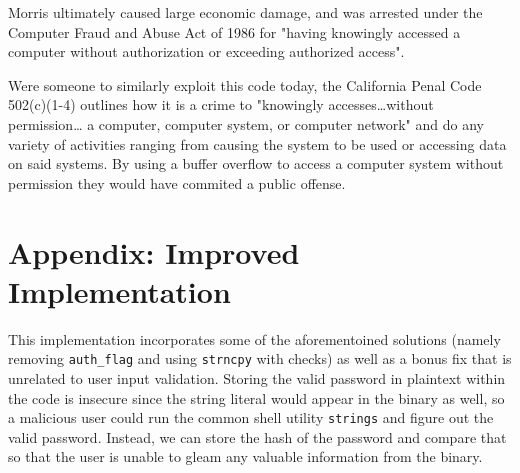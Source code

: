 \documentclass[11pt]{article}
\begin{document}
Morris ultimately caused large economic damage, and was arrested under the Computer Fraud and Abuse Act of 1986 for "having knowingly accessed a computer without authorization or exceeding authorized access".

Were someone to similarly exploit this code today, the California Penal Code 502(c)(1-4) outlines how it is a crime to  "knowingly accesses\ldots{}without permission\ldots{} a computer, computer system, or computer network" and do any variety of activities ranging from causing the system to be used or accessing data on said systems. By using a buffer overflow to access a computer system without permission they would have commited a public offense.


\section*{Appendix: Improved Implementation}
\label{sec:org2685990}
This implementation incorporates some of the aforementoined solutions (namely removing \texttt{auth\_flag} and using \texttt{strncpy} with checks) as well as a bonus fix that is unrelated to user input validation. Storing the valid password in plaintext within the code is insecure since the string literal would appear in the binary as well, so a malicious user could run the common shell utility \texttt{strings} and figure out the valid password. Instead, we can store the hash of the password and compare that so that the user is unable to gleam any valuable information from the binary.
\end{document}
